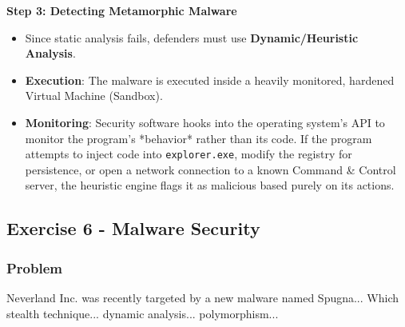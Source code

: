 \documentclass{article}
\begin{document}
\textbf{Step 3: Detecting Metamorphic Malware}
\begin{itemize}
    \item Since static analysis fails, defenders must use \textbf{Dynamic/Heuristic Analysis}.
    \item \textbf{Execution}: The malware is executed inside a heavily monitored, hardened Virtual Machine (Sandbox).
    \item \textbf{Monitoring}: Security software hooks into the operating system's API to monitor the program's *behavior* rather than its code. If the program attempts to inject code into \texttt{explorer.exe}, modify the registry for persistence, or open a network connection to a known Command \& Control server, the heuristic engine flags it as malicious based purely on its actions.
\end{itemize}

\subsection{Exercise 6 - Malware Security}
\subsubsection*{Problem}
Neverland Inc. was recently targeted by a new malware named Spugna... Which stealth technique... dynamic analysis... polymorphism...
\end{document}
